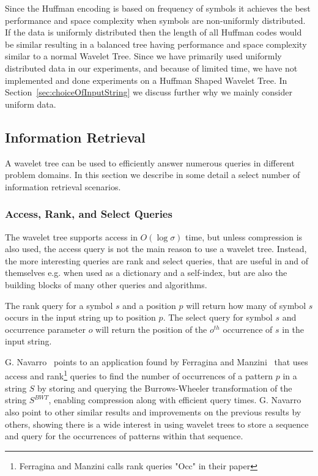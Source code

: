 Since the Huffman encoding is based on frequency of symbols it achieves the best performance and space complexity when symbols are non-uniformly distributed.
If the data is uniformly distributed then the length of all Huffman codes would be similar resulting in a balanced tree having performance and space complexity similar to a normal Wavelet Tree.
Since we have primarily used uniformly distributed data in our experiments, and because of limited time, we have not implemented and done experiments on a Huffman Shaped Wavelet Tree.
In Section~\ref{sec:choiceOfInputString} we discuss further why we mainly consider uniform data.


\subsection{Information Retrieval}
A wavelet tree can be used to efficiently answer numerous queries in different problem domains.
In this section we describe in some detail a select number of information retrieval scenarios.

\subsubsection{Access, Rank, and Select Queries}
The wavelet tree supports access in $O(\log \sigma)$ time, but unless compression is also used, the access query is not the main reason to use a wavelet tree.
Instead, the more interesting queries are rank and select queries, that are useful in and of themselves e.g. when used as a dictionary and a self-index, but are also the building blocks of many other queries and algorithms.

The rank query for a symbol $s$ and a position $p$ will return how many of symbol $s$ occurs in the input string up to position $p$.
The select query for symbol $s$ and occurrence parameter $o$ will return the position of the $o^{th}$ occurrence of $s$ in the input string.

G. Navarro~ points to an application found by Ferragina and Manzini~ that uses access and rank\footnote{Ferragina and Manzini calls rank queries "Occ" in their paper} queries to find the number of occurrences of a pattern $p$ in a string $S$ by storing and querying the Burrows-Wheeler transformation of the string $S^{BWT}$, enabling compression along with efficient query times.
G. Navarro~ also point to other similar results and improvements on the previous results by others, showing there is a wide interest in using wavelet trees to store a sequence and query for the occurrences of patterns within that sequence.

